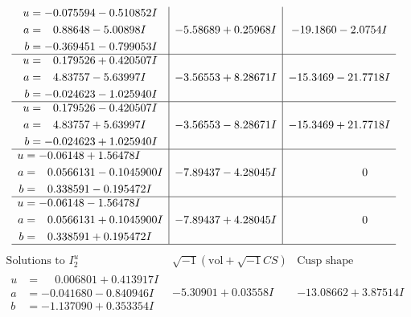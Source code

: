 \documentclass[1p]{elsarticle_modified}
\theoremstyle{definition}
\newcommand{\I}{\sqrt{-1}}
\begin{document}
$$\begin{array}{c|c|c}
\begin{aligned}
u &= -0.075594 - 0.510852 I \\
a &= \phantom{-}0.88648 - 5.00898 I \\
b &= -0.369451 - 0.799053 I\end{aligned}
 & -5.58689 + 0.25968 I & -19.1860 - 2.0754 I \\ \hline\begin{aligned}
u &= \phantom{-}0.179526 + 0.420507 I \\
a &= \phantom{-}4.83757 - 5.63997 I \\
b &= -0.024623 - 1.025940 I\end{aligned}
 & -3.56553 + 8.28671 I & -15.3469 - 21.7718 I \\ \hline\begin{aligned}
u &= \phantom{-}0.179526 - 0.420507 I \\
a &= \phantom{-}4.83757 + 5.63997 I \\
b &= -0.024623 + 1.025940 I\end{aligned}
 & -3.56553 - 8.28671 I & -15.3469 + 21.7718 I \\ \hline\begin{aligned}
u &= -0.06148 + 1.56478 I \\
a &= \phantom{-}0.0566131 - 0.1045900 I \\
b &= \phantom{-}0.338591 - 0.195472 I\end{aligned}
 & -7.89437 - 4.28045 I & \phantom{-0.000000 } 0 \\ \hline\begin{aligned}
u &= -0.06148 - 1.56478 I \\
a &= \phantom{-}0.0566131 + 0.1045900 I \\
b &= \phantom{-}0.338591 + 0.195472 I\end{aligned}
 & -7.89437 + 4.28045 I & \phantom{-0.000000 } 0\\
 \hline 
 \end{array}$$\newpage$$\begin{array}{c|c|c}  
\text{Solutions to }I^u_{2}& \I (\text{vol} + \sqrt{-1}CS) & \text{Cusp shape}\\
 \hline 
\begin{aligned}
u &= \phantom{-}0.006801 + 0.413917 I \\
a &= -0.041680 - 0.840946 I \\
b &= -1.137090 + 0.353354 I\end{aligned}
 & -5.30901 + 0.03558 I & -13.08662 + 3.87514 I \\ \hline\begin{aligned}

\end{aligned}
\end{array}$$
\end{document}
